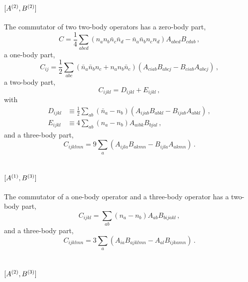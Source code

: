 \section{
  \texorpdfstring{$[{A}^{(2)}, {B}^{(2)}]$}{[2, 2]}
 }

The commutator of two two-body operators
has a zero-body part,
\begin{equation}
  C = \frac{1}{4} \sum_{abcd}
  (n_a n_b \bar{n}_c \bar{n}_d - \bar{n}_a \bar{n}_b n_c n_d)
  A_{abcd} B_{cdab}\,,
\end{equation}
a one-body part,
\begin{equation}
  C_{ij} = \frac{1}{2} \sum_{abc}
  (\bar{n}_a \bar{n}_b n_c + n_a n_b \bar{n}_c)
  (A_{ciab} B_{abcj} - B_{ciab} A_{abcj})\,,
\end{equation}
a two-body part,
\begin{equation}
  C_{ijkl} = D_{ijkl} + E_{ijkl}\,,
\end{equation}
with
\begin{align}
  D_{ijkl} & \equiv \frac{1}{2} \sum_{ab} (\bar{n}_a - n_b)
  (A_{ijab} B_{abkl} - B_{ijab} A_{abkl})\,,                     \\
  E_{ijkl} & \equiv 4 \sum_{ab} (n_a - n_b) A_{aibk} B_{bjal}\,,
\end{align}
and a three-body part,
\begin{equation}
  C_{ijklmn} = 9 \sum_{a} (A_{ijla} B_{akmn} - B_{ijla} A_{akmn})\,.
\end{equation}

\section{
  \texorpdfstring{$[{A}^{(1)}, {B}^{(3)}]$}{[1, 3]}
 }

The commutator of a one-body operator and a three-body operator
has a two-body part,
\begin{equation}
  C_{ijkl} = \sum_{ab} (n_a - n_b) A_{ab} B_{bijakl}\,,
\end{equation}
and a three-body part,
\begin{equation}
  C_{ijklmn} = 3 \sum_{a} (
  A_{ia} B_{ajklmn} - A_{al} B_{ijkamn}
  )\,.
\end{equation}

\section{
  \texorpdfstring{$[{A}^{(2)}, {B}^{(3)}]$}{[2, 3]}
 }

